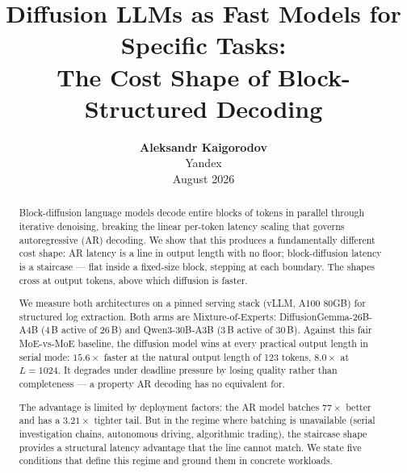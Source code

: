 \documentclass[11pt,a4paper]{article}
\title{\textbf{Diffusion LLMs as Fast Models for Specific Tasks:\\
The Cost Shape of Block-Structured Decoding}}
\author{
  \textbf{Aleksandr Kaigorodov} \\
  \small Yandex \\
  \small August 2026
}
\date{}
\begin{document}
\maketitle

\begin{abstract}
Block-diffusion language models decode entire blocks of tokens in
parallel through iterative denoising, breaking the linear per-token
latency scaling that governs autoregressive (AR) decoding. We show that
this produces a fundamentally different cost shape: AR latency is a
line in output length with no floor; block-diffusion latency is a
staircase --- flat inside a fixed-size block, stepping at each
boundary. The shapes cross at \crossoverL{} output tokens, above which
diffusion is faster.

We measure both architectures on a pinned serving stack (vLLM, A100
80GB) for structured log extraction. Both arms are Mixture-of-Experts:
DiffusionGemma-26B-A4B (4\,B active of 26\,B) and Qwen3-30B-A3B (3\,B
active of 30\,B). Against this fair MoE-vs-MoE baseline, the diffusion
model wins at every practical output length in serial mode:
$15.6\times$ faster at the natural output length of 123 tokens,
$8.0\times$ at $L{=}1024$. It degrades under deadline pressure by
losing quality rather than completeness --- a property AR decoding has
no equivalent for.

The advantage is limited by deployment factors: the AR model batches
$77\times$ better and has a $3.21\times$ tighter tail. But in the
regime where batching is unavailable (serial investigation chains,
autonomous driving, algorithmic trading), the staircase shape
provides a structural latency advantage that the line cannot match. We
state five conditions that define this regime and ground them in
concrete workloads.
\end{abstract}














\appendix










\end{document}
